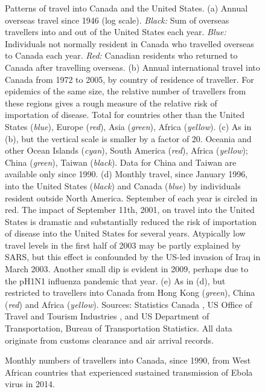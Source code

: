 \documentclass[12pt]{article}
\begin{document}
%
%
\begin{figure}[th]
\caption{Patterns of travel into Canada and the United States.
%
(a) Annual overseas travel since 1946 (log scale).  \emph{Black:} Sum of overseas travellers into and out of
  the United States each year.  \emph{Blue:} Individuals not normally resident in Canada who travelled overseas
  to Canada each year.  \emph{Red:} Canadian residents who returned to Canada after travelling overseas.
%
(b) Annual international travel into Canada from 1972 to 2005, by
  country of residence of traveller.  For epidemics of the same size,
  the relative number of travellers from these regions gives a rough
  measure of the relative risk of importation of disease.  Total for
  countries other than the United States (\emph{blue}), Europe (\emph{red}), Asia (\emph{green}), Africa (\emph{yellow}).
%
(c) As in (b), but the vertical scale is smaller by a factor of 20.
  Oceania and other Ocean Islands (\emph{cyan}), South America (\emph{red}),
 Africa (\emph{yellow}); China (\emph{green}), Taiwan (\emph{black}).  Data for China and Taiwan are
  available only since 1990.
%
(d) Monthly travel, since January 1996, into the United States (\emph{black})
  and Canada (\emph{blue}) by individuals resident outside North America.
  September of each year is circled in red.  The impact of September
  11th, 2001, on travel into the United States is dramatic and
  substantially reduced the risk of importation of disease into the
  United States for several years.  Atypically low travel levels in the first half of
  2003 may be partly explained by SARS, but this effect is confounded
  by the US-led invasion of Iraq in March 2003.  Another small dip is evident in 2009, 
  perhaps due to the pH1N1 influenza pandemic that year.
%
(e) As in (d), but restricted to travellers into Canada from Hong Kong
  (\emph{green}), China (\emph{red}) and Africa (\emph{yellow}).
%
\hfill\break
%
Sources: Statistics Canada \cite{cansim}, US Office of Travel and
Tourism Industries \cite{tinet}, and US Department of Transportation,
Bureau of Transportation Statistics.  All data originate from customs
clearance and air arrival records.
%
}\label{F:travel}
\end{figure}

\begin{figure}[th]
\begin{center}
\end{center}
\caption{Monthly numbers of travellers into Canada, since 1990, from West African countries that experienced sustained transmission of Ebola virus in 2014.}\label{F:westafricatravel}
\end{figure}
\end{document}
